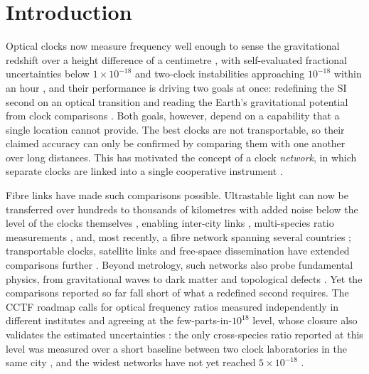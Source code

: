 \documentclass[11pt,a4paper]{article}
\newcommand{\e}[1]{\times 10^{#1}}
\begin{document}

\section{Introduction}
Optical clocks now measure frequency well enough to sense the
gravitational redshift over a height difference of a centimetre
\citep{mcgrew2018geodesy}, with self-evaluated fractional uncertainties
below $1\times10^{-18}$ \citep{arnold2026lu, zhang2026ca} and two-clock
instabilities approaching $10^{-18}$ within an hour
\citep{oelker2019stability}, and their performance is driving two goals at
once: redefining the SI second on an optical transition and reading the
Earth's gravitational potential from clock comparisons
\citep{dimarcq2024roadmap, grotti2018geodesy}. Both goals, however,
depend on a capability that a single location cannot provide. The best
clocks are not transportable, so their claimed accuracy can only be
confirmed by comparing them with one another over long distances. This
has motivated the concept of a clock \emph{network}, in which separate
clocks are linked into a single cooperative instrument
\citep{riehle2017networks, komar2014quantumnetwork}.

Fibre links have made such comparisons possible. Ultrastable light can
now be transferred over hundreds to thousands of kilometres with added
noise below the level of the clocks themselves
\citep{schioppo2022cavities, chen2026dissemination}, enabling inter-city
links \citep{lisdat2016network}, multi-species ratio measurements
\citep{beloy2021bacon}, and, most recently, a fibre network spanning
several countries \citep{pizzocaro2026european}; transportable clocks,
satellite links and free-space dissemination have extended comparisons
further \citep{laurent2015aces, lindvall2025coordinated,
shen2022freespace}. Beyond metrology, such
networks also probe fundamental physics, from gravitational waves
\citep{kolkowitz2016gw} to dark matter and topological defects
\citep{derevianko2014topological}. Yet the comparisons
reported so far fall short of what a redefined second requires. The
CCTF roadmap calls for optical frequency ratios measured independently
in different institutes and agreeing at the few-parts-in-$10^{18}$ level,
whose closure also validates the estimated uncertainties
\citep{dimarcq2024roadmap, riehle2015redefinition}: the only
cross-species ratio reported at this level was measured over a short
baseline between two clock laboratories in the same city
\citep{aeppli2026nist}, and the widest networks have not yet reached
$5\e{-18}$ \citep{lindvall2025coordinated}.
\end{document}
